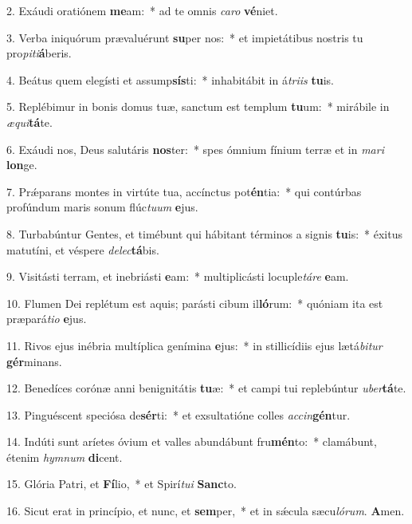 
2. Exáudi oratiónem \textbf{me}am:~* ad te omnis \textit{ca}\textit{ro} \textbf{vé}niet.

3. Verba iniquórum prævaluérunt \textbf{su}per nos:~* et impietátibus nostris tu pro\textit{pi}\textit{ti}\textbf{á}beris.

4. Beátus quem elegísti et assump\textbf{sís}ti:~* inhabitábit in á\textit{tri}\textit{is} \textbf{tu}is.

5. Replébimur in bonis domus tuæ, sanctum est templum \textbf{tu}um:~* mirábile in \textit{æ}\textit{qui}\textbf{tá}te.

6. Exáudi nos, Deus salutáris \textbf{nos}ter:~* spes ómnium fínium terræ et in \textit{ma}\textit{ri} \textbf{lon}ge.

7. Pr\'{\ae}parans montes in virtúte tua, accínctus pot\textbf{én}tia:~* qui contúrbas profúndum maris sonum flúc\textit{tu}\textit{um} \textbf{e}jus.

8. Turbabúntur Gentes, et timébunt qui hábitant términos a signis \textbf{tu}is:~* éxitus matutíni, et véspere \textit{de}\textit{lec}\textbf{tá}bis.

9. Visitásti terram, et inebriásti \textbf{e}am:~* multiplicásti locuple\textit{tá}\textit{re} \textbf{e}am.

10. Flumen Dei replétum est aquis; parásti cibum il\textbf{ló}rum:~* quóniam ita est præpará\textit{ti}\textit{o} \textbf{e}jus.

11. Rivos ejus inébria multíplica genímina \textbf{e}jus:~* in stillicídiis ejus lætá\textit{bi}\textit{tur} \textbf{gér}minans.

12. Benedíces corónæ anni benignitátis \textbf{tu}æ:~* et campi tui replebúntur \textit{u}\textit{ber}\textbf{tá}te.

13. Pinguéscent speciósa de\textbf{sér}ti:~* et exsultatióne colles \textit{ac}\textit{cin}\textbf{gén}tur.

14. Indúti sunt aríetes óvium et valles abundábunt fru\textbf{mén}to:~* clamábunt, étenim \textit{hym}\textit{num} \textbf{di}cent.

15. Glória Patri, et \textbf{Fí}lio,~* et Spirí\textit{tu}\textit{i} \textbf{Sanc}to.

16. Sicut erat in princípio, et nunc, et \textbf{sem}per,~* et in s\'{\ae}cula sæcu\textit{ló}\textit{rum}. \textbf{A}men.